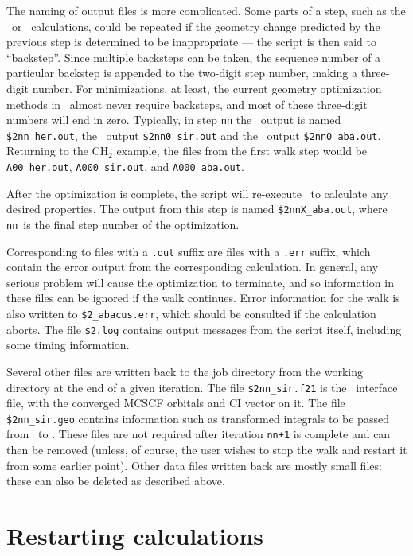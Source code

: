 The naming of output files is more complicated.  Some parts of a
step, such as the \sir\ or \aba\ calculations, could be repeated
if the geometry change predicted by the previous step is
determined to be inappropriate --- the script is then said to
``backstep''.  Since multiple backsteps can be taken, the sequence
number of a particular backstep is appended to the two-digit step
number, making a three-digit number.  For minimizations, at least,
the current geometry optimization methods in \aba\ almost never
require backsteps, and most of these three-digit numbers will end
in zero.  Typically, in step \verb|nn| the \her\ output is named
\verb|$2nn_her.out|, the \sir\ output \verb|$2nn0_sir.out| and the
\aba\ output \verb|$2nn0_aba.out|.  Returning to the CH$_2$
example, the files from the first walk step would be
\verb|A00_her.out|, \verb|A000_sir.out|, and \verb|A000_aba.out|.

After the optimization is complete, the script will re-execute
\aba\ to calculate any desired properties.  The output from this
step is named \verb|$2nnX_aba.out|, where \verb|nn|~is the final
step number of the optimization.

Corresponding to files with a \verb|.out| suffix are files with a
\verb|.err| suffix, which contain the error output from the
corresponding calculation.  In general, any serious problem will
cause the optimization to terminate, and so information in these
files can be ignored if the walk continues.  Error information for
the walk is also written to \verb|$2_abacus.err|, which should be
consulted if the calculation aborts.  The file \verb|$2.log|
contains output messages from the script itself, including some
timing information.

Several other files are written back to the job directory from the
working directory at the end of a given iteration.  The file
\verb|$2nn_sir.f21| is the \sir\ interface file, with the
converged MCSCF orbitals and CI vector on it.  The file
\verb|$2nn_sir.geo| contains information such as transformed
integrals to be passed from \sir\ to \aba.  These files are not
required after iteration \verb|nn+1| is complete and can then be
removed (unless, of course, the user wishes to stop the walk and
restart it from some earlier point).  Other data files written
back are mostly small files: these can also be deleted as
described above.

\section{Restarting calculations}\label{sec:oldwscr}

